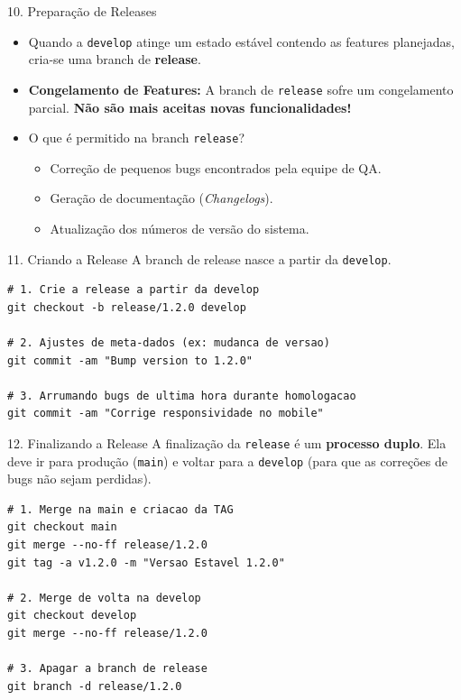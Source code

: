 \documentclass[aspectratio=169]{beamer}
\begin{document}
\begin{frame}{10. Preparação de Releases}
    \begin{itemize}
        \item Quando a \texttt{develop} atinge um estado estável contendo as features planejadas, cria-se uma branch de \textbf{release}.
        \item \textbf{Congelamento de Features:} A branch de \texttt{release} sofre um congelamento parcial. \textbf{Não são mais aceitas novas funcionalidades!}
        \item O que é permitido na branch \texttt{release}?
        \begin{itemize}
            \item Correção de pequenos bugs encontrados pela equipe de QA.
            \item Geração de documentação (\textit{Changelogs}).
            \item Atualização dos números de versão do sistema.
        \end{itemize}
    \end{itemize}
\end{frame}

\begin{frame}[fragile]{11. Criando a Release}
    A branch de release nasce a partir da \texttt{develop}.
    \vspace{0.3cm}
\begin{lstlisting}
# 1. Crie a release a partir da develop
git checkout -b release/1.2.0 develop

# 2. Ajustes de meta-dados (ex: mudanca de versao)
git commit -am "Bump version to 1.2.0"

# 3. Arrumando bugs de ultima hora durante homologacao
git commit -am "Corrige responsividade no mobile"
\end{lstlisting}
\end{frame}

\begin{frame}[fragile]{12. Finalizando a Release}
    A finalização da \texttt{release} é um \textbf{processo duplo}. Ela deve ir para produção (\texttt{main}) e voltar para a \texttt{develop} (para que as correções de bugs não sejam perdidas).
    \vspace{0.2cm}
\begin{lstlisting}
# 1. Merge na main e criacao da TAG
git checkout main
git merge --no-ff release/1.2.0
git tag -a v1.2.0 -m "Versao Estavel 1.2.0"

# 2. Merge de volta na develop
git checkout develop
git merge --no-ff release/1.2.0

# 3. Apagar a branch de release
git branch -d release/1.2.0
\end{lstlisting}
\end{frame}
\end{document}
